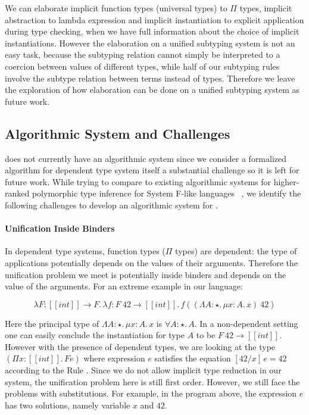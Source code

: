 We can elaborate implicit function types (universal types) to $\Pi$ types,
implicit abstraction to lambda expression and implicit instantiation to explicit
application during type checking, when we have full information about the
choice of implicit instantiations. However the elaboration on a unified subtyping
system is not an easy task, because the subtyping relation cannot simply be interpreted
to a coercion between values of different types, while half of our subtyping
rules involve the subtype relation between terms instead of types.
Therefore we leave the exploration of how elaboration can be done
on a unified subtyping system as future work.

\subsection{Algorithmic System and Challenges}

\name does not currently have an algorithmic system since we
consider a formalized algorithm for dependent type system itself a substantial challenge so it
is left for future work. While trying to compare to existing algorithmic systems
for higher-ranked polymorphic type inference for System F-like languages
~\cite{dunfield2013complete,zhao19mechanical},
we identify the following challenges to develop an algorithmic system for \name.

\paragraph{Unification Inside Binders}
In dependent type systems, function types ($\Pi$ types) are dependent: 
the type of applications potentially depends on the values of their arguments.
Therefore the unification problem we meet is potentially inside binders and
depends on the value of the arguments. For an extreme example in our language:

\begin{equation*}
    \lambda F : [[int]] \rightarrow F.\, \lambda f : F~42 \rightarrow [[int]].\, f ((\Lambda A : \star.\,\mu x : A.\, x)~42)
\end{equation*}

Here the principal type of $\Lambda A : \star.\,\mu x : A.\, x$ is $\forall A : \star.\, A$.
In a non-dependent setting one can easily conclude the instantiation for type $A$ to be
$F~42 \rightarrow [[int]]$. However with the presence of dependent types,
we are looking at the type $(\Pi x : [[int]].\, F e)$ where expression $e$
satisfies the equation $[42/x]\,e = 42$ according to the Rule .
Since we do not allow implicit type reduction in our system,
the unification problem here is still first order. However, we still face the
problems with substitutions. For example, in the program above,
the expression $e$ has two solutions, namely variable $x$
and $42$.

